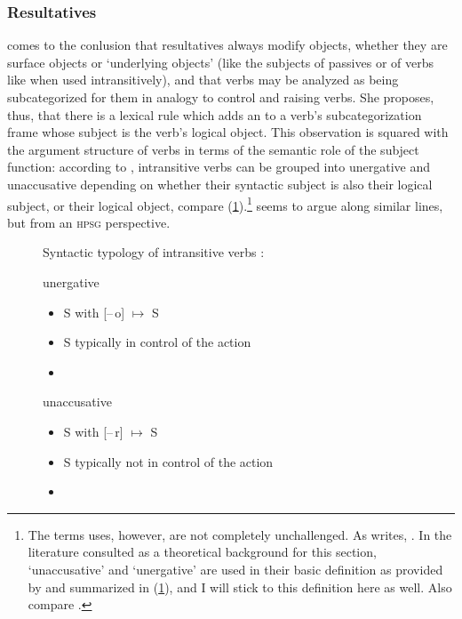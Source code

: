 \subsubsection{Resultatives}

\citet{simpson1983} comes to the conlusion that resultatives always modify
objects, whether they are surface objects or `underlying objects' (like the
subjects of passives or of verbs like  when used intransitively),
and that verbs may be analyzed as being subcategorized for them in analogy to
control and raising verbs. She proposes, thus, that there is a lexical rule
which adds an \XCompl{} to a verb's subcategorization frame whose subject is
the verb's logical object. This observation is squared with the argument
structure of verbs in terms of the semantic role of the subject function:
according to \citet{perlmutter1978}, intransitive verbs can be grouped into
unergative and unaccusative depending on whether their syntactic subject is
also their logical subject, or their logical object, compare
(\ref{ex:verbtyp}).\footnote{The terms \citet{perlmutter1978} uses, however,
are not completely unchallenged. As \citet{dixon2010b} writes,
. In the literature consulted as a theoretical background for this
section, `unaccusative' and `unergative' are used in their basic definition as
provided by \citet{perlmutter1978} and summarized in (\ref{ex:verbtyp}), and I
will stick to this definition here as well. Also compare
\citet[334--336]{bresnan2016}.} \citet{mueller2002} seems to argue along
similar lines, but from an \textsc{hpsg} perspective.

\begin{figure}
\pex\label{ex:verbtyp}%
Syntactic typology of intransitive verbs
\parencites{perlmutter1978}{bresnan2016}:
\a \begin{minipage}[t]{\remaining}
	unergative
	\begin{itemize}[leftmargin=*]
		\item S with [–\,o] $\mapsto$ S
		\item S typically in control of the action
		\item {}
	\end{itemize}
	\end{minipage}

\a \begin{minipage}[t]{\remaining}
	unaccusative
	\begin{itemize}[leftmargin=*]
		\item S with [–\,r] $\mapsto$ S
		\item S typically not in control of the action
		\item {}
	\end{itemize}
	\end{minipage}
\xe
\end{figure}

